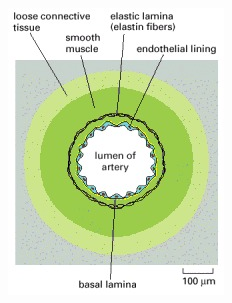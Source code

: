 \begin{figure}[h!]
	\centering
	\begin{minipage}{0.4\textwidth}
		\centering
		\includegraphics[width=\textwidth]{images/AnatomyOfVessel.jpg}
	\end{minipage} %
	\begin{minipage}{0.4\textwidth}
		\centering

\end{minipage}
\end{figure}
